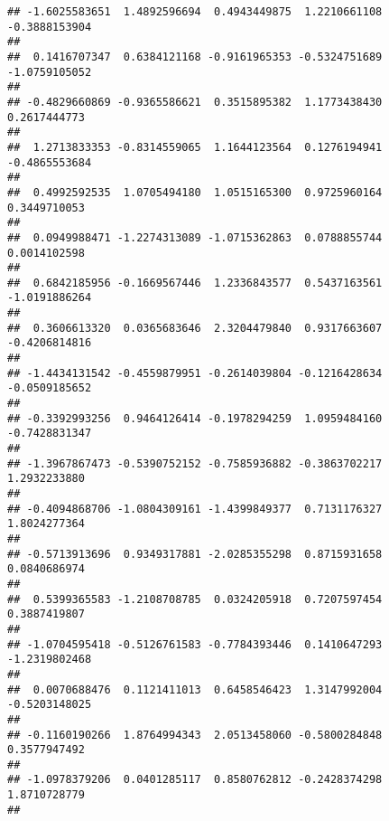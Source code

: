 \documentclass[]{article}
\begin{document}
\begin{verbatim}
## -1.6025583651  1.4892596694  0.4943449875  1.2210661108 -0.3888153904 
##                                                                       
##  0.1416707347  0.6384121168 -0.9161965353 -0.5324751689 -1.0759105052 
##                                                                       
## -0.4829660869 -0.9365586621  0.3515895382  1.1773438430  0.2617444773 
##                                                                       
##  1.2713833353 -0.8314559065  1.1644123564  0.1276194941 -0.4865553684 
##                                                                       
##  0.4992592535  1.0705494180  1.0515165300  0.9725960164  0.3449710053 
##                                                                       
##  0.0949988471 -1.2274313089 -1.0715362863  0.0788855744  0.0014102598 
##                                                                       
##  0.6842185956 -0.1669567446  1.2336843577  0.5437163561 -1.0191886264 
##                                                                       
##  0.3606613320  0.0365683646  2.3204479840  0.9317663607 -0.4206814816 
##                                                                       
## -1.4434131542 -0.4559879951 -0.2614039804 -0.1216428634 -0.0509185652 
##                                                                       
## -0.3392993256  0.9464126414 -0.1978294259  1.0959484160 -0.7428831347 
##                                                                       
## -1.3967867473 -0.5390752152 -0.7585936882 -0.3863702217  1.2932233880 
##                                                                       
## -0.4094868706 -1.0804309161 -1.4399849377  0.7131176327  1.8024277364 
##                                                                       
## -0.5713913696  0.9349317881 -2.0285355298  0.8715931658  0.0840686974 
##                                                                       
##  0.5399365583 -1.2108708785  0.0324205918  0.7207597454  0.3887419807 
##                                                                       
## -1.0704595418 -0.5126761583 -0.7784393446  0.1410647293 -1.2319802468 
##                                                                       
##  0.0070688476  0.1121411013  0.6458546423  1.3147992004 -0.5203148025 
##                                                                       
## -0.1160190266  1.8764994343  2.0513458060 -0.5800284848  0.3577947492 
##                                                                       
## -1.0978379206  0.0401285117  0.8580762812 -0.2428374298  1.8710728779 
##                                                                       

\end{verbatim}
\end{document}
